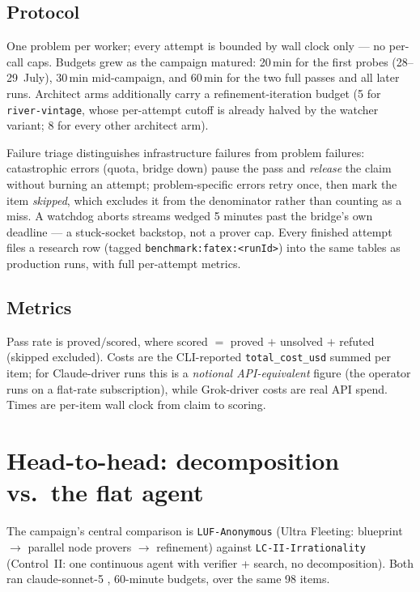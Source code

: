 \documentclass[12pt, a4paper]{article}
\newcommand{\run}[1]{\texttt{#1}}
\begin{document}
\subsection{Protocol}
\label{sec:protocol}

One problem per worker; every attempt is bounded by wall clock only --- no
per-call caps. Budgets grew as the campaign matured: 20\,min for the first
probes (28--29~July), 30\,min mid-campaign, and 60\,min for the two full passes
and all later runs. Architect arms additionally carry
a refinement-iteration budget (5 for \run{river-vintage}, whose per-attempt
cutoff is already halved by the watcher variant; 8 for every other architect
arm).

Failure triage distinguishes infrastructure failures from problem failures:
catastrophic errors (quota, bridge down) pause the pass and \emph{release} the
claim without burning an attempt; problem-specific errors retry once, then mark
the item \emph{skipped}, which excludes it from the denominator rather than
counting as a miss. A watchdog aborts streams wedged 5 minutes past the
bridge's own deadline --- a stuck-socket backstop, not a prover cap. Every
finished attempt files a research row (tagged
\run{benchmark:fatex:<runId>}) into the same tables as production runs,
with full per-attempt metrics.

\subsection{Metrics}

Pass rate is $\text{proved}/\text{scored}$, where scored $=$ proved $+$
unsolved $+$ refuted (skipped excluded). Costs are the CLI-reported
\texttt{total\_cost\_usd} summed per item; for Claude-driver runs this is a
\emph{notional API-equivalent} figure (the operator runs on a flat-rate
subscription), while Grok-driver costs are real API spend. Times are
per-item wall clock from claim to scoring.

\section{Head-to-head: decomposition vs.\ the flat agent}
\label{sec:headtohead}

The campaign's central comparison is \run{LUF-Anonymous} (Ultra Fleeting:
blueprint $\to$ parallel node provers $\to$ refinement) against
\run{LC-II-Irrationality} (Control~II: one continuous agent with verifier +
search, no decomposition). Both ran claude-sonnet-5
\cite{anthropic2026sonnet5}, 60-minute budgets, over the same 98 items.
\end{document}
